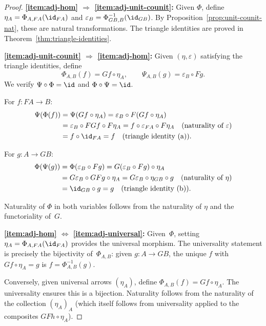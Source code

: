 \begin{proof}
\textbf{\ref{item:adj-hom} $\Rightarrow$ \ref{item:adj-unit-counit}:}
Given $\Phi$, define $\eta_A = \Phi_{A,FA}(\id_{FA})$ and
$\varepsilon_B = \Phi^{-1}_{GB,B}(\id_{GB})$.
By Proposition~\ref{prop:unit-counit-nat}, these are natural transformations.
The triangle identities are proved in Theorem~\ref{thm:triangle-identities}.

\medskip
\textbf{\ref{item:adj-unit-counit} $\Rightarrow$ \ref{item:adj-hom}:}
Given $(\eta,\varepsilon)$ satisfying the triangle identities, define
\[
    \Phi_{A,B}(f) = Gf\circ\eta_A, \qquad
    \Psi_{A,B}(g) = \varepsilon_B\circ Fg.
\]
We verify $\Psi\circ\Phi = \id$ and $\Phi\circ\Psi = \id$.

For $f\colon FA\to B$:
\begin{align*}
    \Psi(\Phi(f)) &= \Psi(Gf\circ\eta_A)
    = \varepsilon_B\circ F(Gf\circ\eta_A) \\
    &= \varepsilon_B\circ FGf\circ F\eta_A
    = f\circ\varepsilon_{FA}\circ F\eta_A \quad\text{(naturality of $\varepsilon$)}\\
    &= f\circ\id_{FA} = f \quad\text{(triangle identity (a))}.
\end{align*}

For $g\colon A\to GB$:
\begin{align*}
    \Phi(\Psi(g)) &= \Phi(\varepsilon_B\circ Fg)
    = G(\varepsilon_B\circ Fg)\circ\eta_A \\
    &= G\varepsilon_B\circ GFg\circ\eta_A
    = G\varepsilon_B\circ\eta_{GB}\circ g \quad\text{(naturality of $\eta$)}\\
    &= \id_{GB}\circ g = g \quad\text{(triangle identity (b))}.
\end{align*}

Naturality of $\Phi$ in both variables follows from the naturality of
$\eta$ and the functoriality of~$G$.

\medskip
\textbf{\ref{item:adj-hom} $\Leftrightarrow$ \ref{item:adj-universal}:}
Given~$\Phi$, setting $\eta_A = \Phi_{A,FA}(\id_{FA})$ provides the
universal morphism.  The universality statement is precisely the
bijectivity of~$\Phi_{A,B}$: given $g\colon A\to GB$, the unique
$f$ with $Gf\circ\eta_A = g$ is $f = \Phi^{-1}_{A,B}(g)$.

Conversely, given universal arrows $(\eta_A)$, define
$\Phi_{A,B}(f) = Gf\circ\eta_A$.  The universality ensures this is
a bijection.  Naturality follows from the naturality of the collection
$(\eta_A)_A$ (which itself follows from universality applied to the
composites $GFh\circ\eta_A$).
\end{proof}


